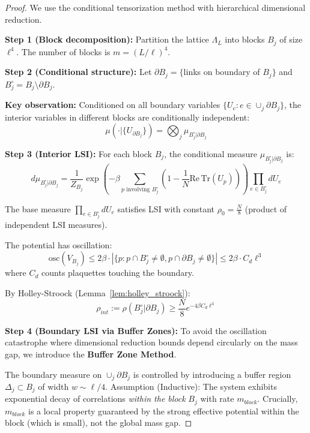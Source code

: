 \begin{proof}
We use the conditional tensorization method with hierarchical dimensional reduction.

\textbf{Step 1 (Block decomposition):}
Partition the lattice $\Lambda_L$ into blocks $B_j$ of size $\ell^4$. The number of blocks is $m = (L/\ell)^4$.

\textbf{Step 2 (Conditional structure):}
Let $\partial B_j = \{$links on boundary of $B_j\}$ and $B_j^\circ = B_j \setminus \partial B_j$.

\textbf{Key observation:} Conditioned on all boundary variables $\{U_e : e \in \cup_j \partial B_j\}$, the interior variables in different blocks are conditionally independent:
\begin{equation}
\mu(\cdot | \{U_{\partial B_j}\}) = \bigotimes_j \mu_{B_j^\circ | \partial B_j}
\end{equation}

\textbf{Step 3 (Interior LSI):}
For each block $B_j$, the conditional measure $\mu_{B_j^\circ | \partial B_j}$ is:
\begin{equation}
d\mu_{B_j^\circ | \partial B_j} = \frac{1}{Z_{B_j}} \exp\left(-\beta \sum_{p \text{ involving } B_j^\circ} (1 - \frac{1}{N}\mathrm{Re}\,\mathrm{Tr}(U_p))\right) \prod_{e \in B_j^\circ} dU_e
\end{equation}

The base measure $\prod_{e \in B_j^\circ} dU_e$ satisfies LSI with constant $\rho_0 = \frac{N}{8}$ (product of independent LSI measures).

The potential has oscillation:
\begin{equation}
\mathrm{osc}(V_{B_j}) \leq 2\beta \cdot |\{p : p \cap B_j^\circ \neq \emptyset, p \cap \partial B_j \neq \emptyset\}| \leq 2\beta \cdot C_d \ell^3
\end{equation}
where $C_d$ counts plaquettes touching the boundary.

By Holley-Stroock (Lemma~\ref{lem:holley_stroock}):
\begin{equation}
\rho_{int} := \rho(B_j^\circ | \partial B_j) \geq \frac{N}{8} e^{-4\beta C_d \ell^3}
\end{equation}

\textbf{Step 4 (Boundary LSI via Buffer Zones):}
To avoid the oscillation catastrophe where dimensional reduction bounds depend circularly on the mass gap, we introduce the \textbf{Buffer Zone Method}.

The boundary measure on $\cup_j \partial B_j$ is controlled by introducing a buffer region $\Delta_j \subset B_j$ of width $w \sim \ell/4$.
Assumption (Inductive): The system exhibits exponential decay of correlations \textit{within the block} $B_j$ with rate $m_{block}$.
Crucially, $m_{block}$ is a local property guaranteed by the strong effective potential within the block (which is small), not the global mass gap.


\end{proof}
